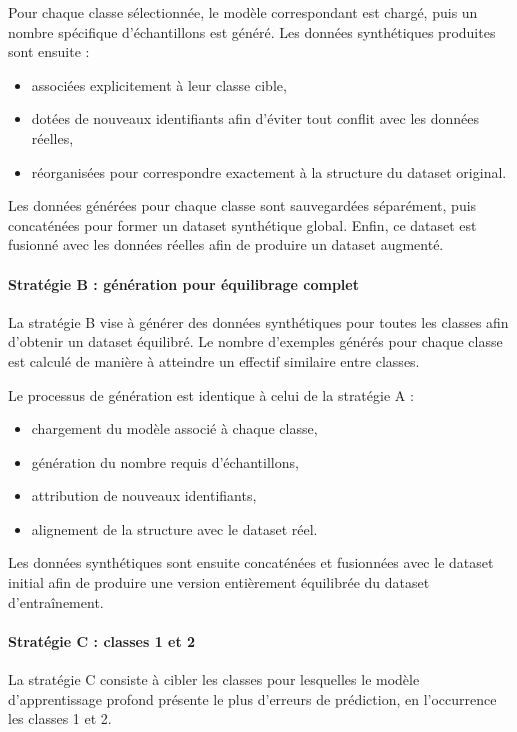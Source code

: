 \documentclass[conference]{IEEEtran}
\begin{document}
Pour chaque classe sélectionnée, le modèle correspondant est chargé, puis un nombre spécifique d’échantillons est généré. Les données synthétiques produites sont ensuite :
\begin{itemize}
    \item associées explicitement à leur classe cible,
    \item dotées de nouveaux identifiants afin d’éviter tout conflit avec les données réelles,
    \item réorganisées pour correspondre exactement à la structure du dataset original.
\end{itemize}

Les données générées pour chaque classe sont sauvegardées séparément, puis concaténées pour former un dataset synthétique global. Enfin, ce dataset est fusionné avec les données réelles afin de produire un dataset augmenté.\\

\paragraph{Stratégie B : génération pour équilibrage complet}\mbox{}

La stratégie B vise à générer des données synthétiques pour toutes les classes afin d’obtenir un dataset équilibré. Le nombre d’exemples générés pour chaque classe est calculé de manière à atteindre un effectif similaire entre classes.

Le processus de génération est identique à celui de la stratégie A :
\begin{itemize}
    \item chargement du modèle associé à chaque classe,
    \item génération du nombre requis d’échantillons,
    \item attribution de nouveaux identifiants,
    \item alignement de la structure avec le dataset réel.
\end{itemize}

Les données synthétiques sont ensuite concaténées et fusionnées avec le dataset initial afin de produire une version entièrement équilibrée du dataset d’entraînement.

\paragraph{Stratégie C : classes 1 et 2}

La stratégie C consiste à cibler les classes pour lesquelles le modèle d’apprentissage profond présente le plus d’erreurs de prédiction, en l’occurrence les classes 1 et 2.
\end{document}
